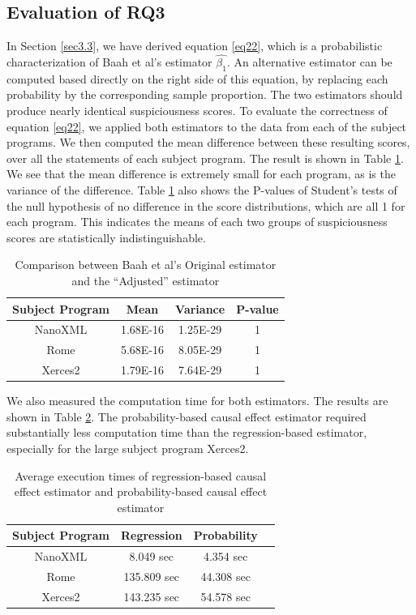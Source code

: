\subsection{Evaluation of RQ3}
In Section \ref{sec3.3}, we have derived equation \eqref{eq22}, which is a probabilistic characterization of Baah et al’s estimator $\widehat{\beta_1}$.  An alternative estimator can be computed based directly on the right side of this equation, by replacing each probability by the corresponding sample proportion.  The two estimators should produce nearly identical suspiciousness scores.  To evaluate the correctness of equation \eqref{eq22}, we applied both estimators to the data from each of the subject programs.  We then computed the mean difference between these resulting scores, over all the statements of each subject program.  The result is shown in Table \ref{table4}.  We see that the mean difference is extremely small for each program, as is the variance of the difference.  Table \ref{table4} also shows the P-values of Student’s  tests of the null hypothesis of no difference in the score distributions, which are all 1 for each program. This indicates the means of each two groups of suspiciousness scores are statistically indistinguishable.

\begin{table}
\caption{Comparison between Baah et al’s  Original estimator and the ``Adjusted” estimator}\label{table4}
\centering
\begin{tabular}{|c|c|c|c|}
\hline
Subject Program	&	Mean	&	Variance	&	P-value	\\ \hline
NanoXML 	&	1.68E-16	&	1.25E-29	&	1	\\ \hline
Rome 	&	5.68E-16	&	8.05E-29	&	1	\\ \hline
Xerces2 	&	1.79E-16	&	7.64E-29	&	1	\\ \hline

\end{tabular}
\end{table}

We also measured the computation time for both estimators. The results are shown in Table \ref{table5}.  The probability-based causal effect estimator required substantially less computation time than the regression-based estimator, especially for the large subject program Xerces2.  

\begin{table}
\caption{Average execution times of regression-based causal effect estimator and probability-based causal effect estimator}\label{table5}
\centering
\begin{tabular}{|c|c|c|c|}
\hline
Subject Program	&	Regression	&	Probability	\\ \hline
NanoXML 	&	8.049 sec	&	4.354 sec	\\ \hline
Rome 	&	135.809 sec	&	44.308 sec	\\ \hline
Xerces2 	&	143.235 sec	&	54.578 sec	\\ \hline

\end{tabular}
\end{table}

